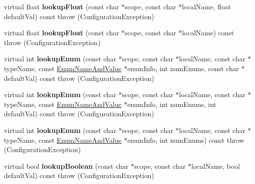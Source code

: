 \begin{DoxyCompactItemize}
\item 
\hypertarget{classCONFIG4CPP__NAMESPACE_1_1ConfigurationImpl_ad2f6e554a0cf5bf98a260b9ef3ac461c}{virtual float {\bfseries lookup\-Float} (const char $\ast$scope, const char $\ast$local\-Name, float default\-Val) const   throw (\-Configuration\-Exception)}\label{classCONFIG4CPP__NAMESPACE_1_1ConfigurationImpl_ad2f6e554a0cf5bf98a260b9ef3ac461c}

\item 
\hypertarget{classCONFIG4CPP__NAMESPACE_1_1ConfigurationImpl_a9c97e46cc9c65addc2c42492f58f37d6}{virtual float {\bfseries lookup\-Float} (const char $\ast$scope, const char $\ast$local\-Name) const   throw (\-Configuration\-Exception)}\label{classCONFIG4CPP__NAMESPACE_1_1ConfigurationImpl_a9c97e46cc9c65addc2c42492f58f37d6}

\item 
\hypertarget{classCONFIG4CPP__NAMESPACE_1_1ConfigurationImpl_a203f8c21ecb861edffe78131f4f6a15b}{virtual int {\bfseries lookup\-Enum} (const char $\ast$scope, const char $\ast$local\-Name, const char $\ast$type\-Name, const \hyperlink{structCONFIG4CPP__NAMESPACE_1_1EnumNameAndValue}{Enum\-Name\-And\-Value} $\ast$enum\-Info, int num\-Enums, const char $\ast$default\-Val) const   throw (\-Configuration\-Exception)}\label{classCONFIG4CPP__NAMESPACE_1_1ConfigurationImpl_a203f8c21ecb861edffe78131f4f6a15b}

\item 
\hypertarget{classCONFIG4CPP__NAMESPACE_1_1ConfigurationImpl_ae566be810edf2490d7321c3873a982b4}{virtual int {\bfseries lookup\-Enum} (const char $\ast$scope, const char $\ast$local\-Name, const char $\ast$type\-Name, const \hyperlink{structCONFIG4CPP__NAMESPACE_1_1EnumNameAndValue}{Enum\-Name\-And\-Value} $\ast$enum\-Info, int num\-Enums, int default\-Val) const   throw (\-Configuration\-Exception)}\label{classCONFIG4CPP__NAMESPACE_1_1ConfigurationImpl_ae566be810edf2490d7321c3873a982b4}

\item 
\hypertarget{classCONFIG4CPP__NAMESPACE_1_1ConfigurationImpl_afc008d55fce47516d88338c9a29c29e1}{virtual int {\bfseries lookup\-Enum} (const char $\ast$scope, const char $\ast$local\-Name, const char $\ast$type\-Name, const \hyperlink{structCONFIG4CPP__NAMESPACE_1_1EnumNameAndValue}{Enum\-Name\-And\-Value} $\ast$enum\-Info, int num\-Enums) const   throw (\-Configuration\-Exception)}\label{classCONFIG4CPP__NAMESPACE_1_1ConfigurationImpl_afc008d55fce47516d88338c9a29c29e1}

\item 
\hypertarget{classCONFIG4CPP__NAMESPACE_1_1ConfigurationImpl_a45c4952e7452313fd2c696593faf4d2a}{virtual bool {\bfseries lookup\-Boolean} (const char $\ast$scope, const char $\ast$local\-Name, bool default\-Val) const   throw (\-Configuration\-Exception)}\label{classCONFIG4CPP__NAMESPACE_1_1ConfigurationImpl_a45c4952e7452313fd2c696593faf4d2a}


\end{DoxyCompactItemize}
